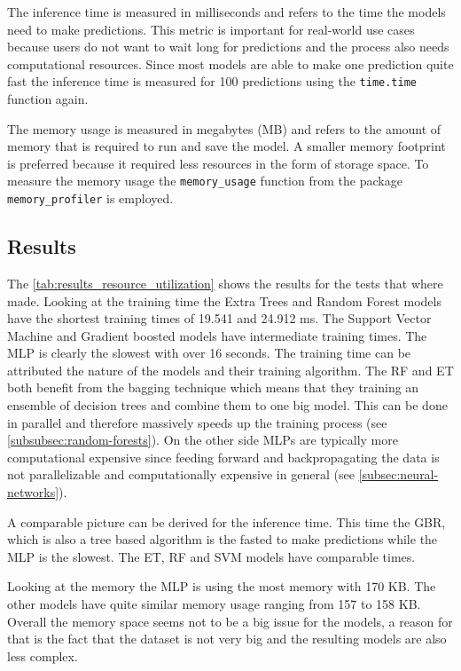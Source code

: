 The inference time is measured in milliseconds and refers to the time the models need to make predictions.
This metric is important for real-world use cases because users do not want to wait long for predictions and the
process also needs computational resources.
Since most models are able to make one prediction quite fast the inference time is measured for 100 predictions
using the \texttt{time.time} function again.

The memory usage is measured in megabytes (MB) and refers to the amount of memory that is required to run and save
the model.
A smaller memory footprint is preferred because it required less resources in the form of storage space.
To measure the memory usage the \texttt{memory\_usage} function from the package \texttt{memory\_profiler} is
employed.


\subsection*{Results}

The \cref{tab:results_resource_utilization} shows the results for the tests that where made.
Looking at the training time the Extra Trees and Random Forest models have the shortest training times
of 19.541 and 24.912 ms.
The Support Vector Machine and Gradient boosted models have intermediate training times.
The MLP is clearly the slowest with over 16 seconds.
The training time can be attributed the nature of the models and their training algorithm.
The RF and ET both benefit from the bagging technique which means that they training an ensemble of decision trees and
combine them to one big model.
This can be done in parallel and therefore massively speeds up the training
process (see \ref{subsubsec:random-forests}).
On the other side MLPs are typically more computational expensive since feeding forward and backpropagating the data
is not parallelizable and computationally expensive in general (see \cref{subsec:neural-networks}).

A comparable picture can be derived for the inference time.
This time the GBR, which is also a tree based algorithm is the fasted to make predictions while the MLP is the slowest.
The ET, RF and SVM models have comparable times.

Looking at the memory the MLP is using the most memory with 170 KB.
The other models have quite similar memory usage ranging from 157 to 158 KB.
Overall the memory space seems not to be a big issue for the models, a reason for that is the fact that the
dataset is not very big and the resulting models are also less complex.


